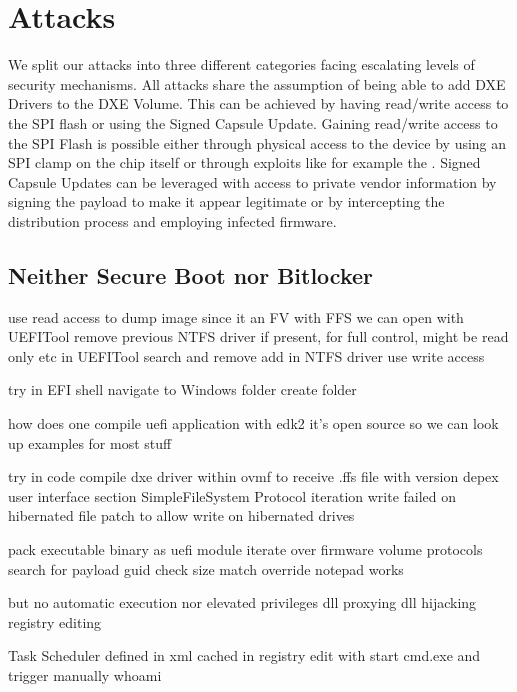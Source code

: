
\chapter{Attacks}

We split our attacks into three different categories facing escalating levels of security mechanisms. All attacks share the assumption of being able to add DXE Drivers to the DXE Volume. This can be achieved by having read/write access to the SPI flash or using the Signed Capsule Update. Gaining read/write access to the SPI Flash is possible either through physical access to the device by using an SPI clamp on the chip itself or through exploits like for example the
. Signed Capsule Updates can be leveraged with access to private vendor information by signing the payload to make it appear legitimate or by intercepting the distribution process and employing infected firmware.




\section{Neither Secure Boot nor Bitlocker}
use read access to dump image
since it an FV with FFS we can open with UEFITool
remove previous NTFS driver if present, for full control, might be read only etc
in UEFITool search and remove
add in NTFS driver
use write access

try in EFI shell
navigate to Windows folder
create folder

how does one compile uefi application with edk2
it's open source so we can look up examples for most stuff

try in code
compile dxe driver within ovmf to receive .ffs file with version depex user interface section
SimpleFileSystem Protocol iteration
write failed on hibernated file
patch to allow write on hibernated drives

pack executable binary as uefi module
iterate over firmware volume protocols
search for payload guid
check size match
override notepad works

but no automatic execution nor elevated privileges
dll proxying
dll hijacking
registry editing

Task Scheduler
defined in xml
cached in registry
edit with start cmd.exe and trigger manually
whoami

